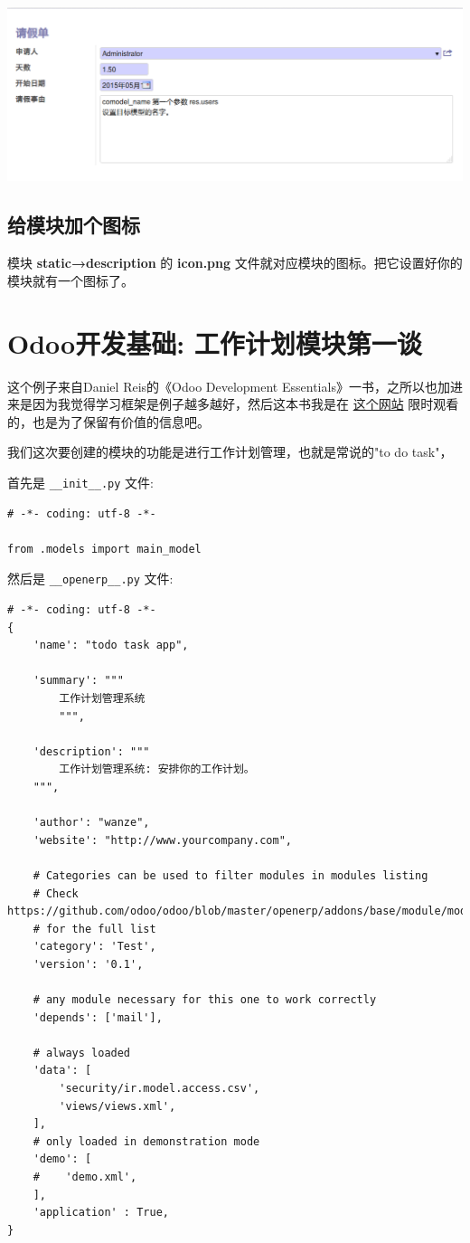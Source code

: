 \documentclass[11pt,a4paper]{sphinxmanual}
\begin{document}
\includegraphics[keepaspectratio,max width=0.95\linewidth]{images/请假单_form02.png}




\section{给模块加个图标}
\label{sec-6-6}
模块 \textbf{static→description} 的 \textbf{icon.png} 文件就对应模块的图标。把它设置好你的模块就有一个图标了。


\chapter{Odoo开发基础: 工作计划模块第一谈}
\label{sec-7}
这个例子来自Daniel Reis的《Odoo Development Essentials》一书，之所以也加进来是因为我觉得学习框架是例子越多越好，然后这本书我是在 \href{https://www.safaribooksonline.com/library/view/odoo-development-essentials/9781784392796/}{这个网站} 限时观看的，也是为了保留有价值的信息吧。

我们这次要创建的模块的功能是进行工作计划管理，也就是常说的"to do task"，

首先是 \verb~__init__.py~ 文件:
\begin{Verbatim}
# -*- coding: utf-8 -*-

from .models import main_model
\end{Verbatim}

然后是 \verb~__openerp__.py~ 文件:

\begin{Verbatim}
# -*- coding: utf-8 -*-
{
    'name': "todo task app",

    'summary': """
        工作计划管理系统
        """,

    'description': """
        工作计划管理系统: 安排你的工作计划。
    """,

    'author': "wanze",
    'website': "http://www.yourcompany.com",

    # Categories can be used to filter modules in modules listing
    # Check https://github.com/odoo/odoo/blob/master/openerp/addons/base/module/module_data.xml
    # for the full list
    'category': 'Test',
    'version': '0.1',

    # any module necessary for this one to work correctly
    'depends': ['mail'],

    # always loaded
    'data': [
        'security/ir.model.access.csv',
        'views/views.xml',
    ],
    # only loaded in demonstration mode
    'demo': [
    #    'demo.xml',
    ],
    'application' : True,
}
\end{Verbatim}
\end{document}
